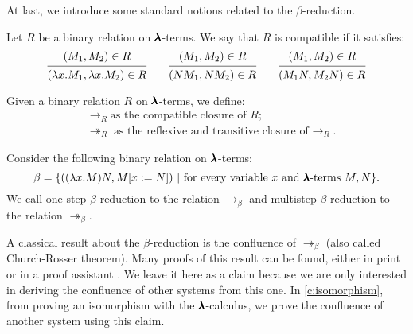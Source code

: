 At last, we introduce some standard notions related to the $\beta$-reduction.

\begin{definition}
  Let $R$ be a binary relation on $\pmb{\lambda}$-terms.
  We say that $R$ is compatible if it satisfies:
  \[
    \begin{prooftree}
      \hypo{ (M_1, M_2) \in R }
      \infer1{ (\lambda x . M_1, \lambda x . M_2) \in R } 
    \end{prooftree}
    \qquad
    \begin{prooftree}
      \hypo{ (M_1, M_2) \in R }
      \infer1{ (N M_1, N M_2) \in R } 
    \end{prooftree}
    \qquad
    \begin{prooftree}
      \hypo{ (M_1, M_2) \in R }
      \infer1{ (M_1 N, M_2 N) \in R }
    \end{prooftree}
  \]
\end{definition}

\begin{notation}
  Given a binary relation $R$ on $\pmb{\lambda}$-terms, we define:
  \begin{align*}
    & \to_R \text{as the compatible closure of $R$} ; \\
    & \twoheadrightarrow_R \text{as the reflexive and transitive closure of $\to_R$}.
  \end{align*}
\end{notation}

\begin{definition}
  \label{beta-reduction}
  Consider the following binary relation on $\pmb{\lambda}$-terms:  
  \[
    \beta = \{ ((\lambda x . M) N, M[x := N]) \
                | \ \text{for every variable $x$ and $\pmb{\lambda}$-terms $M, N$} \}.
  \]  
  We call one step $\beta$-reduction to the relation $\to_\beta$ and multistep $\beta$-reduction to the relation $\twoheadrightarrow_\beta$.
\end{definition}


A classical result about the $\beta$-reduction is the confluence of $\twoheadrightarrow_\beta$ (also called Church-Rosser theorem).
Many proofs of this result can be found, either in print \cite{Barendregt1987, CurryHoward} or in a proof assistant \cite{Copello2017}.
We leave it here as a claim because we are only interested in deriving the confluence of other systems from this one.
In \cref{c:isomorphism}, from proving an isomorphism with the $\pmb{\lambda}$-calculus, we prove the confluence of another system using this claim.

